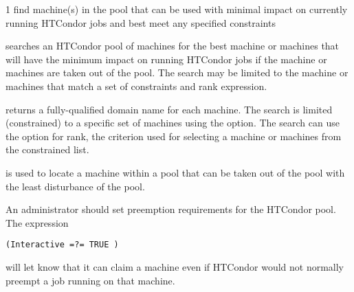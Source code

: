 \begin{ManPage}{\label{man-condor-findhost}}{1}
{find machine(s) in the pool that 
can be used with minimal impact on currently running HTCondor jobs
and best meet any specified constraints}
\Synopsis {}


\Description

 searches an HTCondor pool of machines for the
best machine or machines that
will have the minimum impact on running HTCondor jobs
if the machine or machines are taken out of the pool.
The search may be limited to the machine or machines 
that match a set of constraints and rank expression.

returns a fully-qualified domain name for each machine.
The search is limited (constrained) to a specific set of machines
using the  option.
The search can use the  option for rank,
the criterion used for selecting a machine or machines from the
constrained list.

\begin{Options}
\end{Options}

\GenRem

 is used to locate a machine
within a pool that can be taken out of the pool with the least
disturbance of the pool.

An administrator should set preemption requirements for
the HTCondor pool.
The expression 
\begin{verbatim}
(Interactive =?= TRUE )
\end{verbatim}
will let  know that it can claim a machine even
if HTCondor would not normally preempt a job running on that machine.


\end{ManPage}
